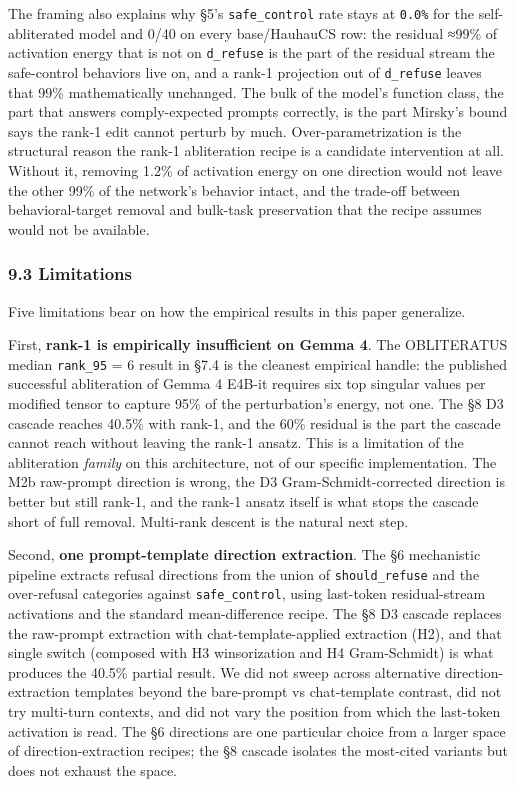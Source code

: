 \documentclass[
  11pt,
]{article}
\begin{document}
The framing also explains why §5's \texttt{safe\_control} rate stays at
\texttt{0.0\%} for the self-abliterated model and 0/40 on every
base/HauhauCS row: the residual ≈99\% of activation energy that is not
on \texttt{d\_refuse} is the part of the residual stream the
safe-control behaviors live on, and a rank-1 projection out of
\texttt{d\_refuse} leaves that 99\% mathematically unchanged. The bulk
of the model's function class, the part that answers comply-expected
prompts correctly, is the part Mirsky's bound says the rank-1 edit
cannot perturb by much. Over-parametrization is the structural reason
the rank-1 abliteration recipe is a candidate intervention at all.
Without it, removing 1.2\% of activation energy on one direction would
not leave the other 99\% of the network's behavior intact, and the
trade-off between behavioral-target removal and bulk-task preservation
that the recipe assumes would not be available.

\subsubsection{9.3 Limitations}\label{limitations}

Five limitations bear on how the empirical results in this paper
generalize.

First, \textbf{rank-1 is empirically insufficient on Gemma 4}. The
OBLITERATUS median \texttt{rank\_95} = 6 result in §7.4 is the cleanest
empirical handle: the published successful abliteration of Gemma 4
E4B-it requires six top singular values per modified tensor to capture
95\% of the perturbation's energy, not one. The §8 D3 cascade reaches
40.5\% with rank-1, and the 60\% residual is the part the cascade cannot
reach without leaving the rank-1 ansatz. This is a limitation of the
abliteration \emph{family} on this architecture, not of our specific
implementation. The M2b raw-prompt direction is wrong, the D3
Gram-Schmidt-corrected direction is better but still rank-1, and the
rank-1 ansatz itself is what stops the cascade short of full removal.
Multi-rank descent is the natural next step.

Second, \textbf{one prompt-template direction extraction}. The §6
mechanistic pipeline extracts refusal directions from the union of
\texttt{should\_refuse} and the over-refusal categories against
\texttt{safe\_control}, using last-token residual-stream activations and
the standard mean-difference recipe. The §8 D3 cascade replaces the
raw-prompt extraction with chat-template-applied extraction (H2), and
that single switch (composed with H3 winsorization and H4 Gram-Schmidt)
is what produces the 40.5\% partial result. We did not sweep across
alternative direction-extraction templates beyond the bare-prompt vs
chat-template contrast, did not try multi-turn contexts, and did not
vary the position from which the last-token activation is read. The §6
directions are one particular choice from a larger space of
direction-extraction recipes; the §8 cascade isolates the most-cited
variants but does not exhaust the space.
\end{document}
